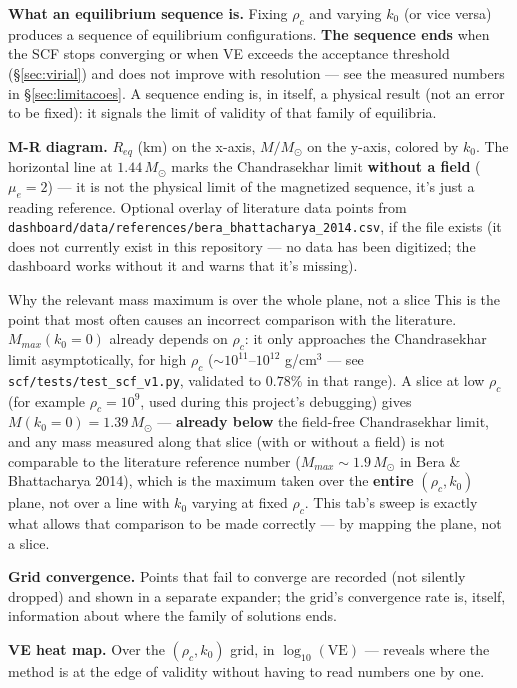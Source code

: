 \documentclass[11pt,a4paper]{scrartcl}
\newcommand{\code}[1]{\texttt{\small #1}}
\begin{document}
\textbf{What an equilibrium sequence is.} Fixing $\rho_c$ and varying
$k_0$ (or vice versa) produces a sequence of equilibrium configurations.
\textbf{The sequence ends} when the SCF stops converging or when VE
exceeds the acceptance threshold (\S\ref{sec:virial}) and does not
improve with resolution --- see the measured numbers in
\S\ref{sec:limitacoes}. A sequence ending is, in itself, a physical
result (not an error to be fixed): it signals the limit of validity of
that family of equilibria.

\textbf{M-R diagram.} $R_{eq}$ (km) on the x-axis, $M/M_\odot$ on the
y-axis, colored by $k_0$. The horizontal line at $1.44\,M_\odot$ marks
the Chandrasekhar limit \textbf{without a field} ($\mu_e=2$) --- it is
not the physical limit of the magnetized sequence, it's just a reading
reference. Optional overlay of literature data points from
\code{dashboard/data/references/bera\_bhattacharya\_2014.csv}, if the
file exists (it does not currently exist in this repository --- no data
has been digitized; the dashboard works without it and warns that it's
missing).

\begin{whybox}{Why the relevant mass maximum is over the whole plane, not a slice}
This is the point that most often causes an incorrect comparison with
the literature. $M_{max}(k_0{=}0)$ already depends on $\rho_c$: it only
approaches the Chandrasekhar limit asymptotically, for high $\rho_c$
($\sim10^{11}$--$10^{12}$ g/cm$^3$ --- see \code{scf/tests/test\_scf\_v1.py},
validated to $0.78\%$ in that range). A slice at low $\rho_c$ (for
example $\rho_c=10^9$, used during this project's debugging) gives
$M(k_0{=}0)=1.39\,M_\odot$ --- \textbf{already below} the field-free
Chandrasekhar limit, and any mass measured along that slice (with or
without a field) is not comparable to the literature reference number
($M_{max}\sim1.9\,M_\odot$ in Bera \& Bhattacharya 2014), which is the
maximum taken over the \textbf{entire} $(\rho_c,k_0)$ plane, not over a
line with $k_0$ varying at fixed $\rho_c$. This tab's sweep is exactly
what allows that comparison to be made correctly --- by mapping the
plane, not a slice.
\end{whybox}

\textbf{Grid convergence.} Points that fail to converge are recorded (not
silently dropped) and shown in a separate expander; the grid's
convergence rate is, itself, information about where the family of
solutions ends.

\textbf{VE heat map.} Over the $(\rho_c,k_0)$ grid, in
$\log_{10}(\mathrm{VE})$ --- reveals where the method is at the edge of
validity without having to read numbers one by one.
\end{document}
